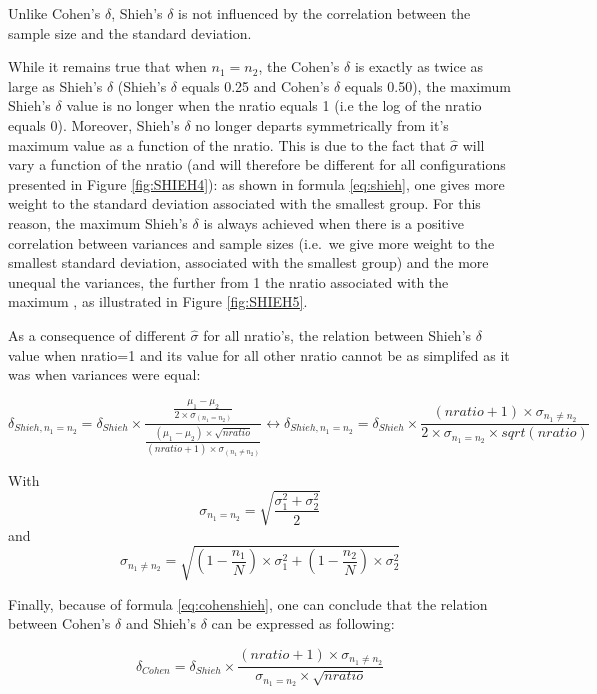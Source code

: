 \documentclass[man]{apa6}
\begin{document}
Unlike Cohen's \(\delta\), Shieh's \(\delta\) is not influenced by the correlation between the sample size and the standard deviation.

While it remains true that when \(n_{1}=n_{2}\), the Cohen's \(\delta\) is exactly as twice as large as Shieh's \(\delta\) (Shieh's \(\delta\) equals 0.25 and Cohen's \(\delta\) equals 0.50), the maximum Shieh's \(\delta\) value is no longer when the nratio equals 1 (i.e the log of the nratio equals 0). Moreover, Shieh's \(\delta\) no longer departs symmetrically from it's maximum value as a function of the nratio. This is due to the fact that \(\hat{\sigma}\) will vary a function of the nratio (and will therefore be different for all configurations presented in Figure \ref{fig:SHIEH4}): as shown in formula \ref{eq:shieh}, one gives more weight to the standard deviation associated with the smallest group. For this reason, the maximum Shieh's \(\delta\) is always achieved when there is a positive correlation between variances and sample sizes (i.e.~we give more weight to the smallest standard deviation, associated with the smallest group) and the more unequal the variances, the further from 1 the nratio associated with the maximum , as illustrated in Figure \ref{fig:SHIEH5}.

As a consequence of different \(\hat{\sigma}\) for all nratio's, the relation between Shieh's \(\delta\) value when nratio=1 and its value for all other nratio cannot be as simplifed as it was when variances were equal:

\begin{equation} 
\delta_{Shieh,n_1=n_2}= \delta_{Shieh} \times \frac{\frac{\mu_1-\mu_2}{2 \times \sigma_{(n_1=n_2)}}}{\frac{(\mu_1-\mu_2) \times \sqrt{nratio}}{(nratio+1) \times \sigma_{(n_1\neq n_2)}}}
\leftrightarrow \delta_{Shieh,n_1=n_2}= \delta_{Shieh} \times \frac{(nratio+1) \times \sigma_{n_1 \neq n_2}}{2 \times \sigma_{n_1=n_2} \times sqrt(nratio)}
\label{eq:shiehvsbaldesign}
\end{equation}

With \[\sigma_{n_1=n_2}= \sqrt{\frac{\sigma_1^2+\sigma_2^2}{2}}\] and
\[\sigma_{n_1 \neq n_2} = \sqrt{(1- \frac{n_1}{N}) \times \sigma_1^2+(1- \frac{n_2}{N}) \times \sigma_2^2}\]

Finally, because of formula \ref{eq:cohenshieh}, one can conclude that the relation between Cohen's \(\delta\) and Shieh's \(\delta\) can be expressed as following:

\begin{equation} 
\delta_{Cohen}= \delta_{Shieh} \times \frac{(nratio+1) \times \sigma_{n_1 \neq n_2}}{\sigma_{n_1=n_2} \times \sqrt{nratio}}
\label{eq:shiehvsbaldesign2}
\end{equation}
\end{document}
